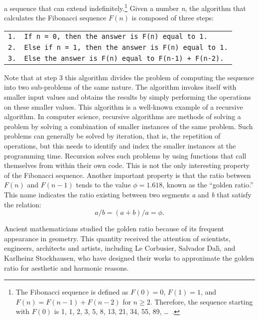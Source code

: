 {{\noindent a sequence that can extend indefinitely.\footnote{The Fibonacci sequence is defined as $F(0)=0$, $F(1)=1$, and $F(n)=F(n-1)+F(n-2)$ for $n\geq 2$. Therefore, the sequence starting with $F(0)$ is 1, 1, 2, 3, 5, 8, 13, 21, 34, 55, 89, \ldots~.\vspace*{14pt}} Given a number \textit{n}, the algorithm that calculates the Fibonacci sequence $F(n)$ is composed of three steps:

\medskip
{
\noindent \begin{tabular}{lp{325.0pt}}
\hline
\texttt{1.} &\texttt{If n = 0, then the answer is F(n) equal to 1.}\\
\texttt{2.} &\texttt{Else if n = 1, then the answer is F(n) equal to 1.}\\
\texttt{3.} &\texttt{Else the answer is F(n) equal to F(n-1) + F(n-2).}\\ \hline
\end{tabular}

\medskip
Note that at step 3 this algorithm divides the problem of computing the sequence into two sub-problems of the same nature. The algorithm invokes itself with smaller input values and obtains the results by simply performing the operations on these smaller values. This algorithm is a well-known example of a recursive algorithm. In computer science, recursive algorithms are methods of solving a problem by solving a combination of smaller instances of the same problem. Such problems can generally be solved by iteration, that is, the repetition of operations, but this needs to identify and index the smaller instances at the programming time. Recursion solves such problems by using functions that call themselves from within their own code. This is not the only interesting property of the Fibonacci sequence. Another important property is that the ratio between $F(n)$ and $F(n-1)$ tends to the value $\phi = 1.618$, known as the ``golden ratio.'' This name indicates the ratio existing between two segments \textit{a} and \textit{b} that satisfy the relation:
\begin{equation*}
a/b=(a+b)/a=\phi .
\end{equation*}

Ancient mathematicians studied the golden ratio because of its frequent appearance in geometry. This quantity received the attention of scientists, engineers, architects and artists, including Le Corbusier, Salvador Dal\'{\i}, and Karlheinz Stockhausen, who have designed their works to approximate the golden ratio for aesthetic and harmonic reasons.

}}}
